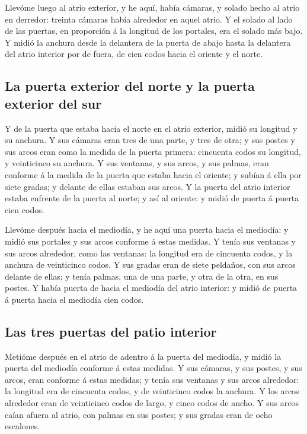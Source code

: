  Llevóme luego al atrio exterior, y he aquí, había cámaras,
y solado hecho al atrio en derredor: treinta cámaras había alrededor en
aquel atrio.  Y el solado al lado de las puertas, en
proporción á la longitud de los portales, era el solado más bajo.
 Y midió la anchura desde la delantera de la puerta de
abajo hasta la delantera del atrio interior por de fuera, de cien codos
hacia el oriente y el norte.

\hypertarget{la-puerta-exterior-del-norte-y-la-puerta-exterior-del-sur}{%
\subsection{La puerta exterior del norte y la puerta exterior del
sur}\label{la-puerta-exterior-del-norte-y-la-puerta-exterior-del-sur}}

 Y de la puerta que estaba hacia el norte en el atrio
exterior, midió su longitud y su anchura.  Y sus cámaras
eran tres de una parte, y tres de otra; y sus postes y sus arcos eran
como la medida de la puerta primera: cincuenta codos su longitud, y
veinticinco su anchura.  Y sus ventanas, y sus arcos, y sus
palmas, eran conforme á la medida de la puerta que estaba hacia el
oriente; y subían á ella por siete gradas; y delante de ellas estaban
sus arcos.  Y la puerta del atrio interior estaba enfrente
de la puerta al norte; y así al oriente: y midió de puerta á puerta cien
codos.

 Llevóme después hacia el mediodía, y he aquí una puerta
hacia el mediodía: y midió sus portales y sus arcos conforme á estas
medidas.  Y tenía sus ventanas y sus arcos alrededor, como
las ventanas: la longitud era de cincuenta codos, y la anchura de
veinticinco codos.  Y sus gradas eran de siete peldaños,
con sus arcos delante de ellas; y tenía palmas, una de una parte, y otra
de la otra, en sus postes.  Y había puerta de hacia el
mediodía del atrio interior: y midió de puerta á puerta hacia el
mediodía cien codos.

\hypertarget{las-tres-puertas-del-patio-interior}{%
\subsection{Las tres puertas del patio
interior}\label{las-tres-puertas-del-patio-interior}}

 Metióme después en el atrio de adentro á la puerta del
mediodía, y midió la puerta del mediodía conforme á estas medidas.
 Y sus cámaras, y sus postes, y sus arcos, eran conforme á
estas medidas; y tenía sus ventanas y sus arcos alrededor: la longitud
era de cincuenta codos, y de veinticinco codos la anchura. 
Y los arcos alrededor eran de veinticinco codos de largo, y cinco codos
de ancho.  Y sus arcos caían afuera al atrio, con palmas en
sus postes; y sus gradas eran de ocho escalones.

